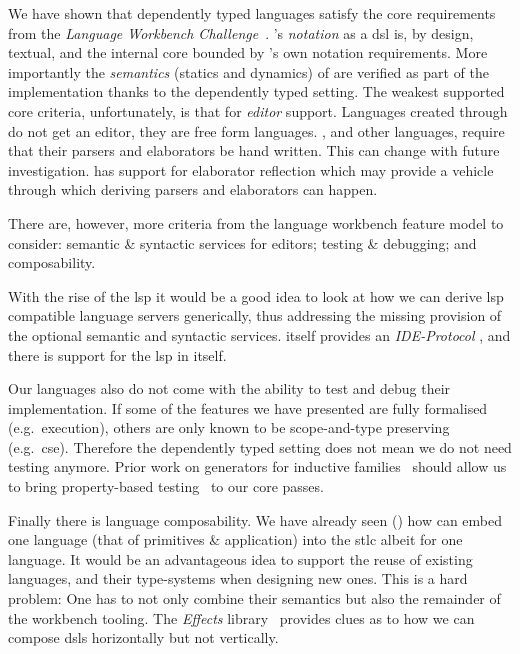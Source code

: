 We have shown that dependently typed languages satisfy the core requirements from the \emph{Language Workbench Challenge}~\cite{DBLP:conf/sle/ErdwegSVBBCGHKLKMPPSSSVVVWW13}.
%
\Velo{}'s \emph{notation} as a \ac{dsl} is, by design, textual, and the internal core bounded by \Idris{}'s own notation requirements.
%
More importantly the \emph{semantics} (statics and dynamics) of \Velo{}
are verified as part of the implementation thanks to the dependently typed setting.
%
The weakest supported core criteria, unfortunately, is that for \emph{editor} support.
%
Languages created through \Idris{} do not get an editor, they are free form languages.
\Velo{}, and other languages, require that their parsers and elaborators be hand written.
This can change with future investigation.
\Idris{} has support for elaborator reflection
which may provide a vehicle through which deriving parsers and elaborators can happen.


There are, however, more criteria from the language workbench feature model to consider:
%
semantic \& syntactic services for editors;
%
testing \& debugging;
%
and
%
composability.
%

With the rise of the \ac{lsp} it would be a good idea to look at how we can derive \ac{lsp} compatible language servers generically, thus addressing the missing provision of the optional semantic and syntactic services.
\Idris{} itself provides an \emph{IDE-Protocol}
, and there is support for the \ac{lsp} in \Idris{} itself.

Our languages also do not come with the ability to test and debug their
implementation.
%
If some of the features we have presented are fully formalised (e.g.\ execution),
others are only known to be scope-and-type preserving (e.g.\ \ac{cse}).
%
Therefore the dependently typed setting does not mean we do not need testing
anymore.
%
Prior work on generators for inductive families~\cite{DBLP:journals/pacmpl/LampropoulosPP18}
should allow us to bring property-based testing~\cite{DBLP:conf/icfp/ClaessenH00} to our core passes.


Finally there is language composability.
%
We have already seen () how \Velo{} can embed one language (that of primitives \& application) into the \ac{stlc} albeit for one language.
%
It would be an advantageous idea to support the reuse of existing languages, and their type-systems when designing new ones.
%
This is a hard problem:
%
One has to not only combine their semantics but also the remainder of the workbench tooling.
%
The \emph{Effects} library~\cite{DBLP:conf/icfp/Brady13} provides clues as to how we can compose \acp{dsl} horizontally but not vertically.


